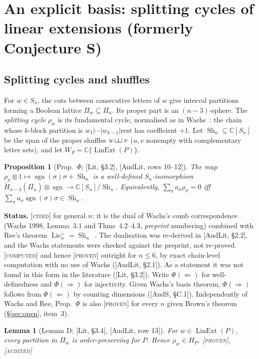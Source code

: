 \documentclass[11pt]{article}
\newtheorem{proposition}[theorem]{Proposition}
\newtheorem{lemma}[theorem]{Lemma}
\theoremstyle{definition}
\theoremstyle{remark}
\newcommand{\Lin}{\operatorname{LinExt}}
\newcommand{\Lie}{\operatorname{Lie}}
\newcommand{\sgn}{\operatorname{sgn}}
\newcommand{\Sh}{\operatorname{Sh}}
\newcommand{\shuf}{\mathbin{\sqcup\mkern-3mu\sqcup}}
\newcommand{\st}[1]{\textup{[\textsc{#1}]}}
\begin{document}
\section{An explicit basis: splitting cycles of linear extensions
(formerly Conjecture S)}\label{sec:basis}

\subsection{Splitting cycles and shuffles}

For $w\in S_n$, the cuts between consecutive letters of $w$ give interval
partitions forming a Boolean lattice $\Pi_w\subseteq\Pi_n$. Its proper part is
an $(n-3)$-sphere. The \emph{splitting cycle} $\rho_w$ is its fundamental
cycle, normalised as in Wachs~\cite{Wachs}: the chain whose $k$-block
partition is $w_1|\cdots|w_{k-1}|\text{rest}$ has coefficient $+1$. Let
$\Sh_n\subseteq\mathbb C[S_n]$ be the span of the proper shuffles $u\shuf v$
($u,v$ nonempty with complementary letter sets), and let
$W_P=\mathbb C\{\Lin(P)\}$.

\begin{proposition}[Prop.~$\Phi$; {[Lit, \S3.2]}, {[AudLit, rows 10--12]}]
\label{prop:Phi}
The map $\rho_\sigma\otimes1\mapsto\sgn(\sigma)\sigma+\Sh_n$ is a
well-defined $S_n$-isomorphism
$\widetilde H_{n-3}(\overline{\Pi_n})\otimes\sgn\to\mathbb C[S_n]/\Sh_n$.
Equivalently, $\sum_\sigma a_\sigma\rho_\sigma=0$ iff
$\sum_\sigma a_\sigma\sgn(\sigma)\sigma\in\Sh_n$.
\end{proposition}

\noindent\textbf{Status.} \st{cited} for general $n$: it is the dual of
Wachs's comb correspondence (Wachs 1998, Lemma~3.1 and Thms~4.2--4.3,
\emph{preprint} numbering) combined with Ree's theorem
$\Lie_n^\perp=\Sh_n$~\cite{Ree,Reutenauer}. The dualisation was re-derived
in [AudLit, \S2.2], and the Wachs statements were checked against the
preprint, not re-proved. \st{computed} and hence \st{proven} outright for
$n\le6$, by exact chain-level computation with no use of Wachs
([AudLit, \S2.1]). As a statement it was not found in this form in the
literature ([Lit, \S3.2]). Write $\Phi(\Leftarrow)$ for well-definedness and
$\Phi(\Rightarrow)$ for injectivity. Given Wachs's basis theorem,
$\Phi(\Rightarrow)$ follows from $\Phi(\Leftarrow)$ by counting dimensions
([AudS, \S C.1]). Independently of Wachs and Ree, Prop.~$\Phi$ is also
\st{proven} for every $n$ given Brown's theorem (\S\ref{sec:open}, item~3).

\begin{lemma}[Lemma D; {[Lit, \S3.4]}, {[AudLit, row 13]}]\label{lem:D}
For $w\in\Lin(P)$, every partition in $\Pi_w$ is order-preserving for $P$.
Hence $\rho_w\in H_P$. \st{proven}, \st{audited}
\end{lemma}
\end{document}
